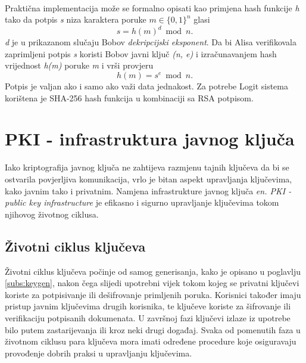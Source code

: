 \paragraph*{}
Praktična implementacija može se formalno opisati kao primjena hash funkcije \textit{h} tako da potpis \textit{s} niza karaktera poruke \(m \in \lbrace 0,1\rbrace ^n\) glasi \[s = h(m)^d\bmod n.\] \textit{d} je u prikazanom slučaju Bobov \textit{dekripcijski eksponent}. Da bi Alisa verifikovala zaprimljeni potpis \textit{s} koristi Bobov javni ključ \textit{(n, e)} i izračunavanjem hash vrijednost \textit{h(m)} poruke \textit{m} i vrši provjeru \[h(m) = s^e\bmod n.\] Potpis je valjan ako i samo ako važi data jednakost. Za potrebe Logit sistema korištena je SHA-256 hash funkcija u kombinaciji sa RSA potpisom.

\pagebreak[4]

\section{PKI - infrastruktura javnog ključa}
Iako kriptografija javnog ključa ne zahtijeva razmjenu tajnih ključeva da bi se ostvarila povjerljiva komunikacija, vrlo je bitan aspekt upravljanja ključevima, kako javnim tako i privatnim. Namjena infrastrukture javnog ključa \textit{en. PKI - public key infrastructure} je efikasno i sigurno upravljanje ključevima tokom njihovog životnog ciklusa.

\subsection{Životni ciklus ključeva}
Životni ciklus ključeva počinje od samog generisanja, kako je opisano u poglavlju \ref{subs:keygen}, nakon čega slijedi upotrebni vijek tokom kojeg se privatni ključevi koriste za potpisivanje ili dešifrovanje primljenih poruka. Korisnici također imaju pristup javnim ključevima drugih korisnika, te ključeve koriste za šifrovanje ili verifikaciju potpisanih dokumenata. U završnoj fazi ključevi izlaze iz upotrebe bilo putem zastarijevanja ili kroz neki drugi događaj. Svaka od pomenutih faza u životnom ciklusu para ključeva mora imati određene procedure koje osiguravaju provođenje dobrih praksi u upravljanju ključevima.

